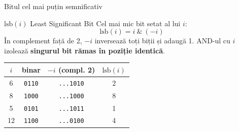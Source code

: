 \documentclass[10pt]{beamer}
\begin{document}
\begin{frame}{Bitul cel mai puțin semnificativ}
  \begin{block}{$\text{lsb}(i)$ \textemdash{} Least Significant Bit}
    Cel mai mic bit setat al lui $i$:
    \[
      \text{lsb}(i) = i\ \&\ (-i)
    \]
    În complement față de 2, $-i$ inversează toți biții și adaugă 1.
    AND-ul cu $i$ izolează \textbf{singurul bit rămas în poziție identică}.
  \end{block}
  \smallskip
  \begin{center}
  \begin{tabular}{cccc}
    \toprule
    $i$ & binar & $-i$ (compl. 2) & $\text{lsb}(i)$ \\
    \midrule
    6  & \texttt{0110} & \texttt{...1010} & 2 \\
    8  & \texttt{1000} & \texttt{...1000} & 8 \\
    5  & \texttt{0101} & \texttt{...1011} & 1 \\
    12 & \texttt{1100} & \texttt{...0100} & 4 \\
    \bottomrule
  \end{tabular}
  \end{center}
\end{frame}
\end{document}
